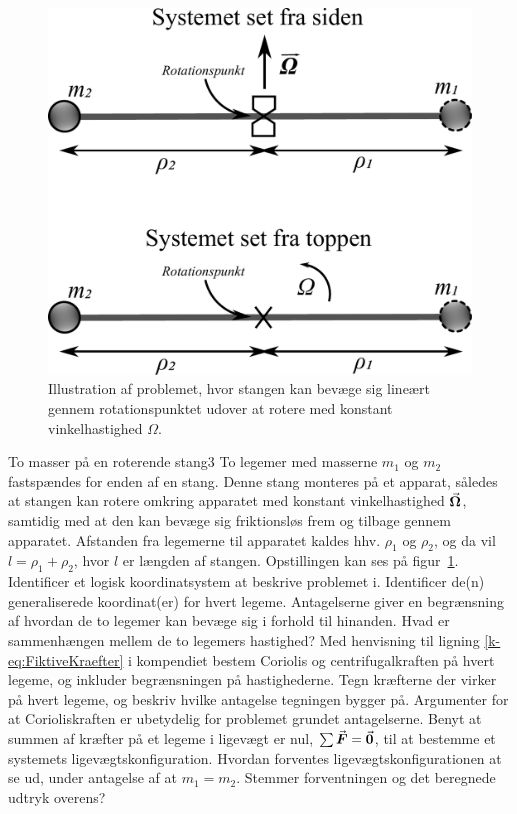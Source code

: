 \begin{figure}
	\centering
	\includegraphics[width=.67\textwidth]{Analytisk-Mekanik/ToMasserRoterendeStang.pdf}
	\caption{Illustration af problemet, hvor stangen kan bevæge sig lineært gennem rotationspunktet udover at rotere med konstant vinkelhastighed $\Omega$.}	\label{fig:ToMasserRoterendeStang}
\end{figure}
%
%
\begin{opgave}{To masser på en roterende stang}{3}
To legemer med masserne $m_1$ og $m_2$ fastspændes for enden af en stang. Denne stang monteres på et apparat, således at stangen kan rotere omkring apparatet med konstant vinkelhastighed ${\vec{\boldsymbol{\Omega}}}$, samtidig med at den kan bevæge sig friktionsløs frem og tilbage gennem apparatet. Afstanden fra legemerne til apparatet kaldes hhv. $\rho_1$ og $\rho_2$, og da vil $l = \rho_1 + \rho_2$, hvor $l$ er længden af stangen. Opstillingen kan ses på figur~\ref{fig:ToMasserRoterendeStang}.
\opg Identificer et logisk koordinatsystem at beskrive problemet i.
\opg Identificer de(n) generaliserede koordinat(er) for hvert legeme.
\opg Antagelserne giver en begrænsning af hvordan de to legemer kan bevæge sig i forhold til hinanden. Hvad er sammenhængen mellem de to legemers hastighed?
\opg Med henvisning til ligning \eqref{k-eq:FiktiveKraefter} i kompendiet bestem Coriolis og centrifugalkraften på hvert legeme, og inkluder begrænsningen på hastighederne.
\opg Tegn kræfterne der virker på hvert legeme, og beskriv hvilke antagelse tegningen bygger på.
\opg Argumenter for at Corioliskraften er ubetydelig for problemet grundet antagelserne.
\opg Benyt at summen af kræfter på et legeme i ligevægt er nul, $\sum{\vec{\boldsymbol{F}}} = {\vec{\boldsymbol{0}}}$, til at bestemme et systemets ligevægtskonfiguration.
\opg Hvordan forventes ligevægtskonfigurationen at se ud, under antagelse af at $m_1 = m_2$.
\opg Stemmer forventningen og det beregnede udtryk overens?
\end{opgave}
